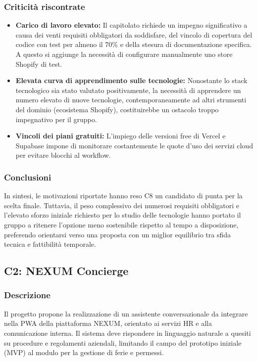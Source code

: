 \subsubsection{Criticità riscontrate}
\begin{itemize}
    \item \textbf{Carico di lavoro elevato:} Il capitolato richiede un impegno significativo a causa dei venti requisiti obbligatori da soddisfare, del vincolo di copertura del codice con test per almeno il 70\% e della stesura di documentazione specifica. A questo si aggiunge la necessità di configurare manualmente uno store Shopify di test.
    \item \textbf{Elevata curva di apprendimento sulle tecnologie:} Nonostante lo stack tecnologico sia stato valutato positivamente, la necessità di apprendere un numero elevato di nuove tecnologie, contemporaneamente ad altri strumenti del dominio (ecosistema Shopify), costituirebbe un ostacolo troppo impegnativo per il gruppo.
    \item \textbf{Vincoli dei piani gratuiti:} L'impiego delle versioni free di Vercel e Supabase impone di monitorare costantemente le quote d'uso dei servizi cloud per evitare blocchi al workflow.
\end{itemize}

\subsubsection{Conclusioni}
In sintesi, le motivazioni riportate hanno reso C8 un candidato di punta per la scelta finale. Tuttavia, il peso complessivo dei numerosi requisiti obbligatori e l'elevato sforzo iniziale richiesto per lo studio delle tecnologie hanno portato il gruppo a ritenere l'opzione meno sostenibile rispetto al tempo a disposizione, preferendo orientarsi verso una proposta con un miglior equilibrio tra sfida tecnica e fattibilità temporale.

\subsection{C2: NEXUM Concierge}

\subsubsection{Descrizione}
Il progetto propone la realizzazione di un assistente conversazionale da integrare nella PWA della piattaforma NEXUM, orientato ai servizi HR e alla comunicazione interna. Il sistema deve rispondere in linguaggio naturale a quesiti su procedure e regolamenti aziendali, limitando il campo del prototipo iniziale (MVP) al modulo per la gestione di ferie e permessi.

